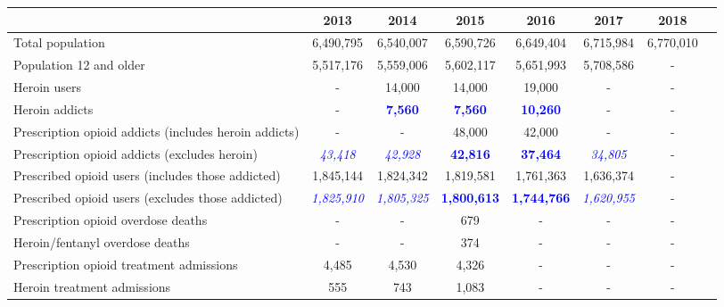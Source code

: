 \documentclass[12pt]{article}
\begin{document}
\begin{sidewaystable} 
\begin{tabular}{|l|c|c|c|c|c|c|l}
\hline
 & \footnotesize{2013} & \footnotesize{2014} & \footnotesize{2015} & \footnotesize{2016} & \footnotesize{2017} & \footnotesize{2018}\\
\hline
\footnotesize
Total population & \footnotesize{6,490,795} & \footnotesize{6,540,007} & \footnotesize{6,590,726} & \footnotesize{6,649,404} & \footnotesize{6,715,984} & \footnotesize{6,770,010}\\
\footnotesize
Population 12 and older & \footnotesize{5,517,176} & \footnotesize{5,559,006} & \footnotesize{5,602,117} & \footnotesize{5,651,993} & \footnotesize{5,708,586} & -\\
\footnotesize
Heroin users& - &\footnotesize{14,000} & \footnotesize{14,000} & \footnotesize{19,000}  & - &-\\
\footnotesize
Heroin addicts & - &\footnotesize{\textcolor{blue}{\textbf{7,560}}} & \footnotesize{\textcolor{blue}{\textbf{7,560}}} & \footnotesize{\textcolor{blue}{\textbf{10,260}}}  & - &-\\
\footnotesize
Prescription opioid addicts (includes heroin addicts) & - &  - & \footnotesize{48,000}
& \footnotesize{42,000} & - &-\\
\footnotesize
Prescription opioid addicts (excludes heroin) & \footnotesize{\textit{\textcolor{blue}{43,418}}} & \footnotesize{\textit{\textcolor{blue}{42,928}}} & \footnotesize{\textcolor{blue}{\textbf{42,816}}
} & \footnotesize{\textcolor{blue}{\textbf{37,464}}} & \footnotesize{\textit{\textcolor{blue}{34,805}}} &-\\
\footnotesize
Prescribed opioid users (includes those addicted) & \footnotesize{1,845,144} &\footnotesize{1,824,342} & \footnotesize{1,819,581} & \footnotesize{1,761,363} &  \footnotesize{1,636,374} &-\\
\footnotesize
Prescribed opioid users (excludes those addicted)   & \footnotesize{\textit{\textcolor{blue}{1,825,910}}} &\footnotesize{\textit{\textcolor{blue}{1,805,325}
}} & \footnotesize{\textcolor{blue}{\textbf{1,800,613}}} & \footnotesize{\textcolor{blue}{\textbf{1,744,766}}} &  \footnotesize{\textit{\textcolor{blue}{1,620,955}
}} &-\\
\footnotesize
Prescription opioid overdose deaths & - & - & \footnotesize{679} & -  & - &-\\
\footnotesize
Heroin/fentanyl overdose deaths & - & - & \footnotesize{374} & -  & - &-\\
\footnotesize
Prescription opioid treatment admissions & \footnotesize{4,485} & \footnotesize{4,530} & \footnotesize{4,326} & -  & - &-\\
\footnotesize
Heroin treatment admissions & \footnotesize{555} & \footnotesize{743} & \footnotesize{1,083} & -  & - &-\\
\hline
\end{tabular} \\
\label{tab:template}


\end{sidewaystable}
\end{document}
